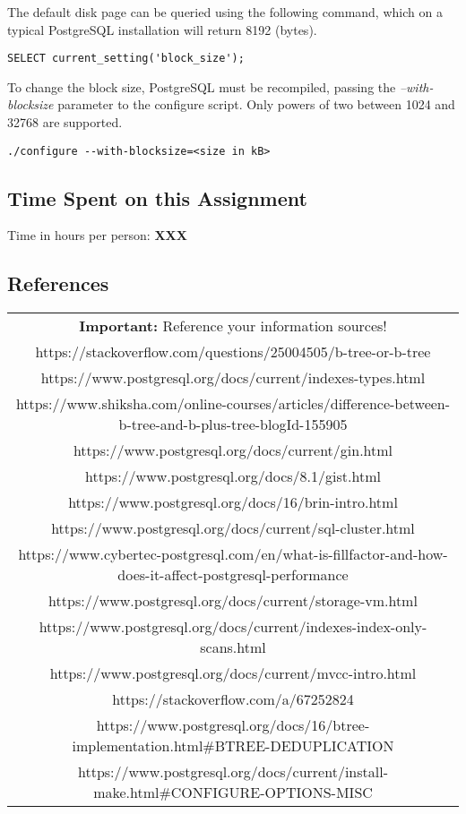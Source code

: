 \documentclass[11pt]{scrartcl}
\begin{document}
The default disk page can be queried using the following command, which on a typical PostgreSQL installation will return 8192 (bytes).

\begin{lstlisting}[style=dbtsql]
SELECT current_setting('block_size');
\end{lstlisting}

To change the block size, PostgreSQL must be recompiled, passing the \textit{--with-blocksize} parameter to the configure script. Only powers of two between 1024 and 32768 are supported.

\begin{lstlisting}
./configure --with-blocksize=<size in kB>
\end{lstlisting}

\subsection*{Time Spent on this Assignment}

Time in hours per person: \textbf{XXX}

\subsection*{References}

\begin{table}[H]
  \centering
  \begin{tabular}{c}
    \hline
    \textbf{Important:} Reference your information sources! \tabularnewline
    https://stackoverflow.com/questions/25004505/b-tree-or-b-tree \tabularnewline
    https://www.postgresql.org/docs/current/indexes-types.html \tabularnewline
    https://www.shiksha.com/online-courses/articles/difference-between-b-tree-and-b-plus-tree-blogId-155905 \tabularnewline
    https://www.postgresql.org/docs/current/gin.html \tabularnewline
    https://www.postgresql.org/docs/8.1/gist.html \tabularnewline
    https://www.postgresql.org/docs/16/brin-intro.html \tabularnewline
    https://www.postgresql.org/docs/current/sql-cluster.html \tabularnewline
    https://www.cybertec-postgresql.com/en/what-is-fillfactor-and-how-does-it-affect-postgresql-performance \tabularnewline
    https://www.postgresql.org/docs/current/storage-vm.html \tabularnewline
    https://www.postgresql.org/docs/current/indexes-index-only-scans.html \tabularnewline
    https://www.postgresql.org/docs/current/mvcc-intro.html \tabularnewline
    https://stackoverflow.com/a/67252824 \tabularnewline
    https://www.postgresql.org/docs/16/btree-implementation.html#BTREE-DEDUPLICATION \tabularnewline
    https://www.postgresql.org/docs/current/install-make.html#CONFIGURE-OPTIONS-MISC
    \hline
  \end{tabular}
\end{table}
\end{document}
